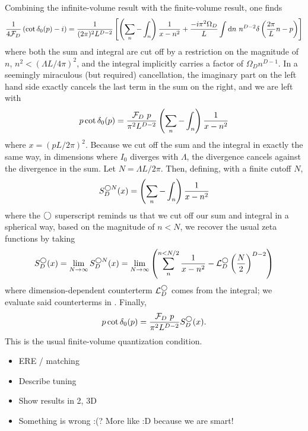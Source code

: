 Combining the infinite-volume result with the finite-volume result, one finds
\begin{equation}
    \frac{1}{4\mathcal{F}_D}\left(\cot \delta_0(p) - i\right) = \frac{1}{(2\pi)^2 L^{D-2}}\left[ \left(\sum_n- \int_n\right) \frac{1}{x-n^2} + \frac{-i \pi^2\Omega_D}{L} \int \mathrm{d}n\ n^{D-2} \delta\left(\frac{2\pi}{L}n - p\right) \right]
\end{equation}
where both the sum and integral are cut off by a restriction on the magnitude of $n$, $n^2 < (\Lambda L / 4\pi)^2$, and the integral implicitly carries a factor of $\Omega_D n^{D-1}$.
In a seemingly miraculous (but required) cancellation, the imaginary part on the left hand side exactly cancels the last term in the sum on the right, and we are left with
\begin{equation}
    p \cot \delta_0(p) = \frac{\mathcal{F}_D\ p}{\pi^2 L^{D-2}} \left(\sum_n-\int_n\right) \frac{1}{x-n^2}
\end{equation}
where $x=(pL/2\pi)^2$.
Because we cut off the sum and the integral in exactly the same way, in dimensions where $I_0$ diverges with $\Lambda$, the divergence cancels against the divergence in the sum.
Let $N=\Lambda L/2\pi$.
Then, defining, with a finite cutoff $N$,
\begin{equation}\label{eq:spherical cutoff S}
    S^{\bigcirc N}_D(x) = \left(\sum_n- \int_n\right) \frac{1}{x-n^2}
\end{equation}
where the $\bigcirc$ superscript reminds us that we cut off our sum and integral in a spherical way, based on the magnitude of $n<N$, we recover the usual \Luscher zeta functions by taking
\begin{equation}
    S^\bigcirc_D(x)
    =
    \lim_{N\rightarrow\infty} S^{\bigcirc N}_D(x)
    =
    \lim_{N\rightarrow\infty}\left( \sum_n^{n < N/2} \frac{1}{x-n^2} - \mathcal{L}_D^\bigcirc \left(\frac{N}{2}\right)^{D-2}\right)
\end{equation}
where dimension-dependent counterterm $\mathcal{L}_D^\bigcirc$ comes from the integral; we evaluate said counterterms in .
Finally,
\begin{equation}\label{eq:spherical quantization}
    p \cot \delta_0(p) = \frac{\mathcal{F}_D\ p}{\pi^2 L^{D-2}} S^\bigcirc_D(x).
\end{equation}
This is the usual \Luscher finite-volume quantization condition.

\begin{itemize}
    \item ERE / matching
    \item Describe tuning
    \item Show results in 2, 3D
    \item Something is wrong :(?  More like :D because we are smart!
\end{itemize}
